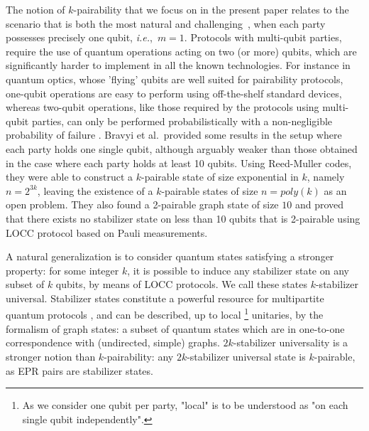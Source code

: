 \documentclass[10pt,a4paper]{article}
\begin{document}
The notion of $k$-pairability that we focus on in the present paper relates to the scenario that is both the most natural and challenging~\cite{bravyi2022generating}, when each party possesses precisely one qubit, \emph{i.e.},~$m=1$. Protocols with multi-qubit parties, require the use of quantum operations acting on two (or more) qubits, which are significantly harder to implement in all the known technologies. For instance in quantum optics, whose 'flying' qubits are well suited for pairability protocols, one-qubit operations are easy to perform using off-the-shelf standard devices, whereas two-qubit operations, like those required by the protocols using multi-qubit parties, can only be performed probabilistically with a non-negligible probability of failure \cite{bartolucci2023fusion,Lee2023graphtheoretical,ghanbari2024optimization,lu2007experimental}. Bravyi et al.~provided some results in the setup where each party holds one single qubit, although arguably weaker than those obtained in the case where each party holds at least 10 qubits. Using Reed-Muller codes,  they were able to construct a $k$-pairable state of size  exponential in $k$, namely $n = 2^{3k}$,  leaving  the existence of a $k$-pairable states of size $n=poly(k)$ as an open problem. They also found a 2-pairable graph state of size $10$ and proved that there exists no stabilizer state on less than 10 qubits that is 2-pairable using LOCC protocol based on Pauli measurements.

A natural generalization is to consider quantum states satisfying a stronger property: for some integer $k$, it is possible to induce any stabilizer state on any subset of $k$ qubits, by means of LOCC protocols. We call these states $k$-stabilizer universal. Stabilizer states constitute a powerful resource for multipartite quantum protocols \cite{Hein06,MS08, javelle2012new, vrana2017entanglement}, and can be described, up to local \footnote{As we consider one qubit per party, "local" is to be understood as "on each single qubit independently".} unitaries, by the formalism of graph states: a subset of quantum states which are in one-to-one correspondence with (undirected, simple) graphs. $2k$-stabilizer universality is a stronger notion than $k$-pairability: any $2k$-stabilizer universal state is $k$-pairable, as EPR pairs are stabilizer states. 
\end{document}
